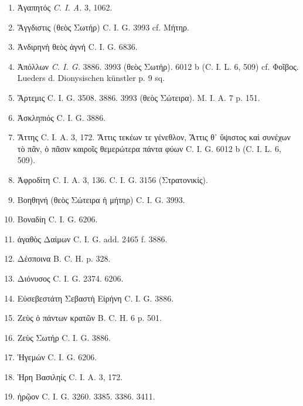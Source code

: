 \documentclass[a4paper, 11pt, oneside, polutonikogreek, german]{article}
\begin{document}
\begin{enumerate}
\item Ἀγαπητός \emph{C. I. A.} 3, 1062.

\item Ἄγγδιστις (θεὸς Σωτήρ) C. I. G. 3993 cf. Μήτηρ.

\item Ἀνδιρηνὴ θεὸς ἁγνή C. I. G. 6836.

\item Ἀπόλλων \emph{C. I. G.} 3886. 3993 (θεὸς Σωτήρ). 6012 b (C. I. L. 6, 509) cf. Φοῖβος. Lueders d. Dionysischen künstler p. 9 sq.

\item Ἄρτεμις C. I. G. 3508. 3886. 3993 (θεὸς Σώτειρα). M. I. A. 7 p. 151.

\item Ἀσκληπιός C. I. G. 3886.

\item Ἄττης C. I. A. 3, 172. Ἄττις τεκέων τε γένεθλον, Ἄττις θ᾽ ὕψιστος καὶ συνέχων τὸ πᾶν, ὁ πᾶσιν καιροῖς θεμερώτερα πάντα φύων C. I. G. 6012 b (C. I. L. 6, 509).

\item Ἀφροδίτη C. I. A. 3, 136. C. I. G. 3156 (Στρατονικίς).

\item Βοηθηνή (θεὸς Σώτειρα ἡ μήτηρ) C. I. G. 3993.

\item Βοναδίη C. I. G. 6206.

\item ἀγαθὸς Δαίμων C. I. G. add. 2465 f. 3886.

\item Δέσποινα B. C. H. p. 328.

\item Διόνυσος C. I. G. 2374. 6206.

\item Εὐσεβεστάτη Σεβαστὴ Εἰρήνη C. I. G. 3886.

\item Ζεὺς ὁ πάντων κρατῶν B. C. H. 6 p. 501.

\item Ζεὺς Σωτήρ C. I. G. 3886.

\item Ἡγεμών C. I. G. 6206.

\item Ἡρη Βασιληίς C. I. A. 3, 172.

\item ἡρῷον C. I. G. 3260. 3385. 3386. 3411.


\end{enumerate}
\end{document}
